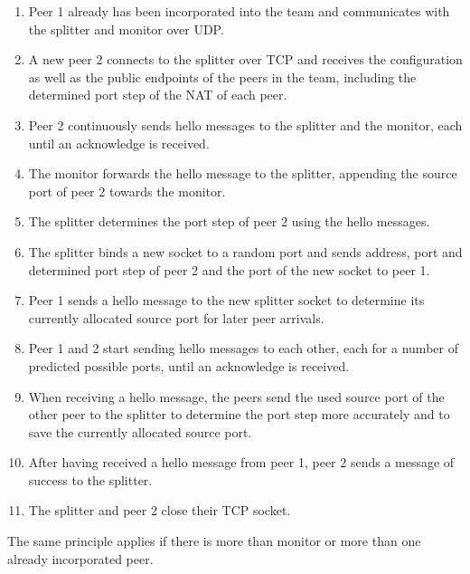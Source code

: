 \documentclass{article}
\begin{document}
\begin{enumerate}

\item Peer 1 already has been incorporated into the team and communicates
  with the splitter and monitor over UDP.

\item A new peer 2 connects to the splitter over TCP and receives the
  configuration as well as the public endpoints of the peers in the
  team, including the determined port step of the NAT of each peer.

\item Peer 2 continuously sends hello messages to the splitter and the
  monitor, each until an acknowledge is received.

\item The monitor forwards the hello message to the splitter, appending
  the source port of peer 2 towards the monitor.

\item The splitter determines the port step of peer 2 using the hello
  messages.

\item The splitter binds a new socket to a random port and sends address,
  port and determined port step of peer 2 and the port of the new
  socket to peer 1.

\item Peer 1 sends a hello message to the new splitter socket to determine
  its currently allocated source port for later peer arrivals.

\item Peer 1 and 2 start sending hello messages to each other, each for a
  number of predicted possible ports, until an acknowledge is
  received.

\item When receiving a hello message, the peers send the used source port
  of the other peer to the splitter to determine the port step more
  accurately and to save the currently allocated source port.

\item After having received a hello message from peer 1, peer 2 sends a
  message of success to the splitter.

\item The splitter and peer 2 close their TCP socket.

\end{enumerate}

The same principle applies if there is more than monitor or more than
one already incorporated peer.
\end{document}
